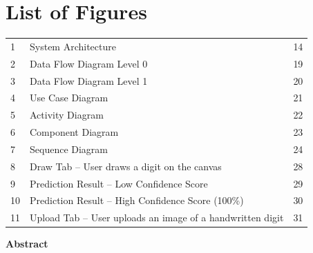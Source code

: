 \documentclass[12pt,a4paper]{report}
\begin{document}
\section*{List of Figures \\}
\begin{flushleft}
\begin{tabular}{p{0.7cm} p{13.5cm} p{1.5cm}}

1  & System Architecture                                                   \dotfill & 14  \\[0.50cm]
2  & Data Flow Diagram Level 0                                             \dotfill & 19 \\[0.50cm]
3  & Data Flow Diagram Level 1                                             \dotfill & 20 \\[0.50cm]
4  & Use Case Diagram                                                      \dotfill & 21 \\[0.50cm]
5  & Activity Diagram                                                      \dotfill & 22 \\[0.50cm]
6  & Component Diagram                                                     \dotfill & 23 \\[0.50cm]
7  & Sequence Diagram                                                      \dotfill & 24 \\[0.50cm]
8  & Draw Tab -- User draws a digit on the canvas                          \dotfill & 28 \\[0.50cm]
9  & Prediction Result -- Low Confidence Score                             \dotfill & 29 \\[0.50cm]
10 & Prediction Result -- High Confidence Score (100\%)                    \dotfill & 30 \\[0.50cm]
11 & Upload Tab -- User uploads an image of a handwritten digit            \dotfill & 31 \\[0.50cm]

\end{tabular}
\end{flushleft}

\newpage

\begin{center}
{\Large \bfseries Abstract}\\[30pt]
\end{center}
\end{document}
